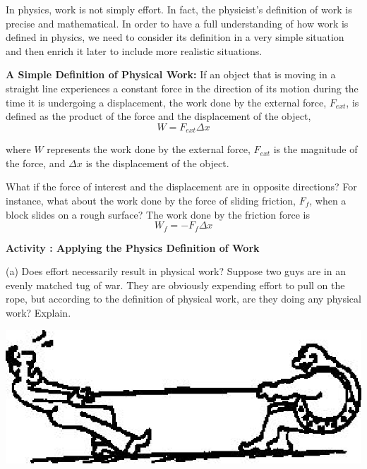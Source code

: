 In physics, work is not simply effort. In fact, the physicist's definition of
work is precise and mathematical. In order to have a full understanding of how
work is defined in physics, we need to consider its definition in a very simple
situation and then enrich it later to include more realistic situations.

\textbf{A Simple Definition of Physical Work:} If an object that is moving in
a straight line experiences a constant force in the direction of its motion
during the time it is undergoing a displacement, the work done by the external
force, \( F_{ext} \), is defined as the product of the force and the displacement of the object, 
\[
W=F_{ext}\Delta x\]


where $W$ represents the work done by the external force, \( F_{ext} \) is the
magnitude of the force, and \( \Delta  x\) is the displacement of the object.

What if the force of interest and the displacement are in opposite directions? For instance, what about the work done by the force of sliding friction,
\( F_{f} \), when a block slides on a rough surface? The work done by the friction force is
\[
W_{f}=-F_{f}\Delta x\]

\newpage

\textbf{Activity  : Applying the Physics Definition of Work} 

(a) Does effort necessarily result in physical work? Suppose two guys are in
an evenly matched tug of war. They are obviously expending effort to pull on the
rope, but according to the definition of physical work, are they doing any physical
work? Explain.

\vspace{0.3cm}
{\par\centering \includegraphics{workAndKE/work_power_fig3.eps} \par}
\vspace{0.3cm}

